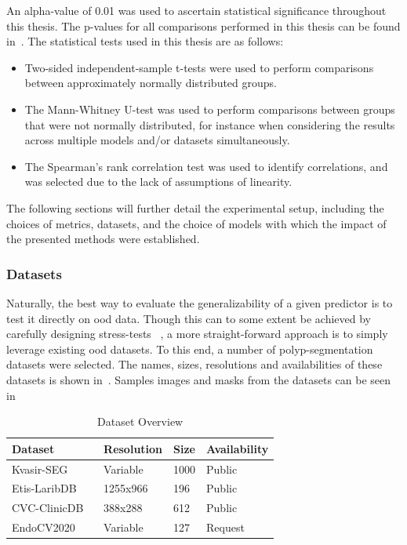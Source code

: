 An alpha-value of 0.01 was used to ascertain statistical significance throughout this thesis. The p-values for all comparisons performed in this thesis can be found in~. The statistical tests used in this thesis are as follows:
\begin{itemize}
    \item Two-sided independent-sample t-tests were used to perform comparisons between approximately normally distributed groups.
    \item The Mann-Whitney U-test was used to perform comparisons between groups that were not normally distributed, for instance when considering the results across multiple models and/or datasets simultaneously.
    \item The Spearman's rank correlation test was used to identify correlations, and was selected due to the lack of assumptions of linearity.
\end{itemize}

The following sections will further detail the experimental setup, including the choices of metrics, datasets, and the choice of models with which the impact of the presented methods were established. 
   \subsubsection{Datasets} \label{datasets}
    Naturally, the best way to evaluate the generalizability of a given predictor is to test it directly on \gls{ood} data. Though this can to some extent be achieved by carefully designing stress-tests ~\cite{damour2020underspecification}, a more straight-forward approach is to simply leverage existing \gls{ood} datasets. To this end, a number of polyp-segmentation datasets were selected. The names, sizes, resolutions and availabilities of these datasets is shown in~. Samples images and masks from the datasets can be seen in~
    
    \begin{table}[htb]
        \centering
       \begin{tabularx}{\linewidth}{lXXX}
        \toprule
        Dataset & Resolution & Size & Availability \\
        \midrule
        Kvasir-SEG ~\cite{kvasir} & Variable & 1000 & Public \\
        Etis-LaribDB ~\cite{etis-larib} & 1255x966 & 196  & Public \\
        CVC-ClinicDB ~\cite{cvc-clinic} & 388x288 & 612  & Public \\
        EndoCV2020 ~\cite{endocv2020} & Variable & 127  & Request \\
        \bottomrule
    \end{tabularx}
        \caption{Dataset Overview}
        \label{tab:datasets}
    \end{table}
    
